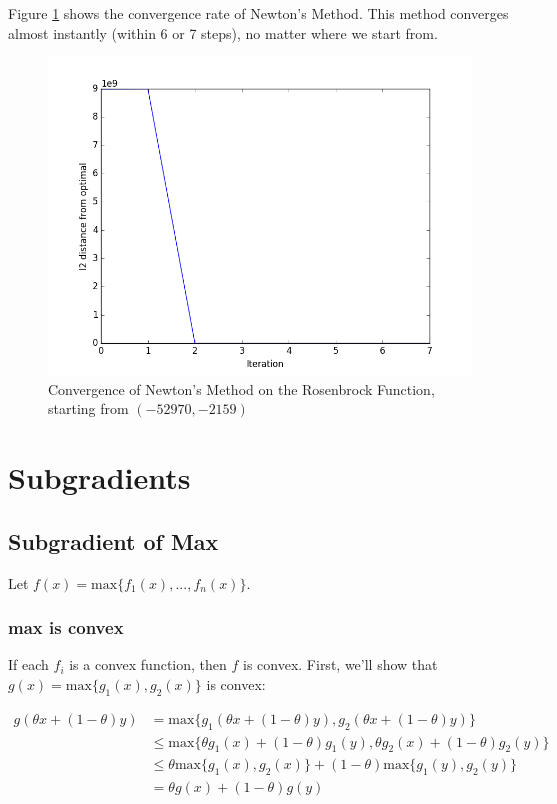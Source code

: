 \documentclass{article}
\renewcommand\max[1]{\text{max} \lbrace #1 \rbrace}
\begin{document}
Figure \ref{fig:rosenbrock-newtons} shows the convergence rate of Newton's Method. This method converges almost instantly (within 6 or 7 steps), no matter where we start from.

\begin{figure}[!ht]
  \centering
  \includegraphics[width=\textwidth,keepaspectratio=true]{rosenbrock-newtons.png}
  \caption{Convergence of Newton's Method on the Rosenbrock Function, starting from $(-52970, -2159)$}
  \label{fig:rosenbrock-newtons}
\end{figure}

\section{Subgradients}

\subsection{Subgradient of Max}

Let $f(x) = \max{f_1(x), ..., f_n(x)}$.

\subsubsection{\textbf{max} is convex}

If each $f_i$ is a convex function, then $f$ is convex. First, we'll show that $g(x) = \max{g_1(x), g_2(x)}$ is convex:

\begin{align}
  g(\theta x + (1-\theta)y) &= \max{g_1(\theta x + (1-\theta)y), g_2(\theta x + (1-\theta)y)} \\
  &\leq \max{\theta g_1(x) + (1-\theta)g_1(y), \theta g_2(x) + (1-\theta)g_2(y)} \\
  &\leq \theta \max{g_1(x), g_2(x)} + (1-\theta)\max{g_1(y), g_2(y)} \\
  &= \theta g(x) + (1-\theta) g(y)
\end{align}
\end{document}
